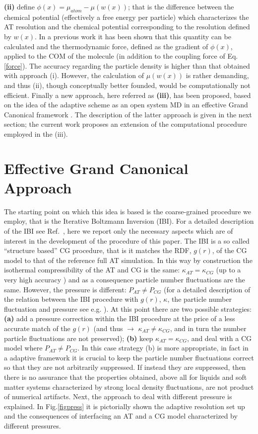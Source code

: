 \documentclass[aps,pre,preprint]{revtex4}
\newcommand{\redc}[1]{{\color{red} #1}}
\begin{document}
{\bf (ii)} define $\phi(x)=\mu_{atom}-{\mu}{(w(x))}$; that is the difference between the chemical potential (effectively a free energy per particle) which characterizes the AT resolution and the chemical potential corresponding to the resolution defined by $w(x)$. In a previous work \cite{simon} it has been shown that this quantity can be calculated and the thermodynamic force, defined as the gradient of $\phi(x)$, applied to the COM of the molecule (in addition to the coupling force of Eq.\ref{force}). The accuracy regarding the particle density is higher than that obtained with approach (i). However, the calculation of $\mu(w(x))$ is rather demanding, and thus (ii), though conceptually better founded, would be computationally not efficient. Finally a new approach, here referred as {\bf (iii)}, has been proposed, based on the idea of the adaptive scheme as an open system MD in an effective Grand Canonical framework \cite{prlgc}. The description of the latter approach is given in the next section; the current work proposes an extension of the computational procedure employed in the (iii).

\section{Effective Grand Canonical Approach}
The starting point on which this idea is based is the coarse-grained procedure we employ, that is the Iterative Boltzmann Inversion  (IBI). 
For a detailed description of the IBI see Ref.~\cite{ibm}, here we report only the necessary aspects which are of interest in the development of the procedure of this paper.
The IBI is a so called ``structure based'' CG procedure, that is it matches the RDF, $g(r)$, of the CG model to that of the reference full AT simulation. In this way by construction the isothermal compressibility of the AT and CG is the same: $\kappa_{AT}=\kappa_{CG}$ \redc{(up to a very high accuracy \cite{han})} and as a consequence particle number fluctuations are the same. However, the pressure is different: $P_{AT}\neq P_{CG}$  (for a detailed description of the relation between the IBI procedure with $g(r)$, $\kappa$, the particle number fluctuation and pressure see e.g. \cite{han}). At this point there are two possible strategies: {\bf (a)}  add a pressure correction within the IBI procedure at the price of a less accurate match of the $g(r)$ (and thus $\rightarrow$ $\kappa_{AT}\neq\kappa_{CG}$, and in turn the number particle fluctuations are not preserved); {\bf (b)} keep $\kappa_{AT}=\kappa_{CG}$, and deal with a CG model where $P_{AT}\neq P_{CG}$. In this case strategy (b) is more appropriate, in fact in a adaptive framework it is crucial to keep the particle number fluctuations correct so that they are not arbitrarily suppressed. If instead they are suppressed, then there is no assurance that the properties obtained, above all for liquids and soft matter systems characterized by strong local density fluctuations, are not product of numerical artifacts. Next, the approach to deal with different pressure is explained. In Fig.\ref{figpress} it is pictorially shown the adaptive resolution set up and the consequences of interfacing an AT and a CG model characterized by different pressures. 
\end{document}

